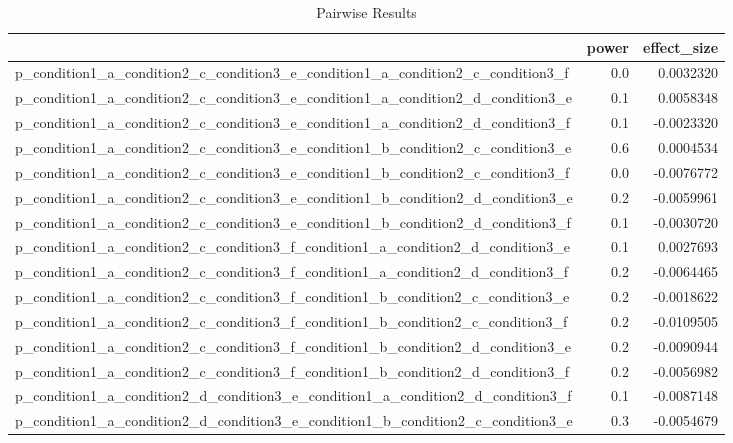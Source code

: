 \documentclass[
]{book}
\begin{document}
\begin{table}[!h]

\caption{\label{tab:unnamed-chunk-265}Pairwise Results}
\centering
\begin{tabular}[t]{l|r|r}
\hline
  & power & effect\_size\\
\hline
p\_condition1\_a\_condition2\_c\_condition3\_e\_condition1\_a\_condition2\_c\_condition3\_f & 0.0 & 0.0032320\\
\hline
p\_condition1\_a\_condition2\_c\_condition3\_e\_condition1\_a\_condition2\_d\_condition3\_e & 0.1 & 0.0058348\\
\hline
p\_condition1\_a\_condition2\_c\_condition3\_e\_condition1\_a\_condition2\_d\_condition3\_f & 0.1 & -0.0023320\\
\hline
p\_condition1\_a\_condition2\_c\_condition3\_e\_condition1\_b\_condition2\_c\_condition3\_e & 0.6 & 0.0004534\\
\hline
p\_condition1\_a\_condition2\_c\_condition3\_e\_condition1\_b\_condition2\_c\_condition3\_f & 0.0 & -0.0076772\\
\hline
p\_condition1\_a\_condition2\_c\_condition3\_e\_condition1\_b\_condition2\_d\_condition3\_e & 0.2 & -0.0059961\\
\hline
p\_condition1\_a\_condition2\_c\_condition3\_e\_condition1\_b\_condition2\_d\_condition3\_f & 0.1 & -0.0030720\\
\hline
p\_condition1\_a\_condition2\_c\_condition3\_f\_condition1\_a\_condition2\_d\_condition3\_e & 0.1 & 0.0027693\\
\hline
p\_condition1\_a\_condition2\_c\_condition3\_f\_condition1\_a\_condition2\_d\_condition3\_f & 0.2 & -0.0064465\\
\hline
p\_condition1\_a\_condition2\_c\_condition3\_f\_condition1\_b\_condition2\_c\_condition3\_e & 0.2 & -0.0018622\\
\hline
p\_condition1\_a\_condition2\_c\_condition3\_f\_condition1\_b\_condition2\_c\_condition3\_f & 0.2 & -0.0109505\\
\hline
p\_condition1\_a\_condition2\_c\_condition3\_f\_condition1\_b\_condition2\_d\_condition3\_e & 0.2 & -0.0090944\\
\hline
p\_condition1\_a\_condition2\_c\_condition3\_f\_condition1\_b\_condition2\_d\_condition3\_f & 0.2 & -0.0056982\\
\hline
p\_condition1\_a\_condition2\_d\_condition3\_e\_condition1\_a\_condition2\_d\_condition3\_f & 0.1 & -0.0087148\\
\hline
p\_condition1\_a\_condition2\_d\_condition3\_e\_condition1\_b\_condition2\_c\_condition3\_e & 0.3 & -0.0054679\\

\end{tabular}
\end{table}
\end{document}
